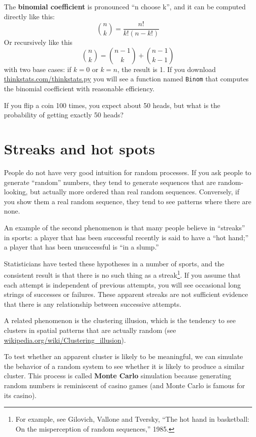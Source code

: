 \documentclass[12pt]{book}
\begin{document}
The {\bf binomial coefficient} is pronounced ``n choose k'', and it
can be computed directly like this:
%
\[ \binom{n}{k} = \frac{n!}{k!(n-k!)}  \]
%
Or recursively like this
%
\[ \binom{n}{k} = \binom{n-1}{k} + \binom{n-1}{k-1} \]
%
with two base cases: if $k=0$ or $k=n$, the result is 1.  If you
download \url{thinkstats.com/thinkstats.py} you will see a function
named {\tt Binom} that computes the binomial coefficient with reasonable
efficiency.

\begin{ex}
If you flip a coin 100 times, you expect about 50 heads, but what
is the probability of getting exactly 50 heads?


\end{ex}


\section{Streaks and hot spots}

People do not have very good intuition for random processes.  If you
ask people to generate ``random'' numbers, they tend to generate
sequences that are random-looking, but actually more ordered than real
random sequences.  Conversely, if you show them a real random
sequence, they tend to see patterns where there are none.

An example of the second phenomenon is that many people believe
in ``streaks'' in sports: a player that has been successful recently
is said to have a ``hot hand;'' a player that has been unsuccessful is
``in a slump.''

Statisticians have tested these hypotheses in a number of sports, and
the consistent result is that there is no such thing as a
streak\footnote{For example, see Gilovich, Vallone and Tversky, ``The
  hot hand in basketball: On the misperception of random sequences,''
  1985.}.  If you assume that each attempt is independent of previous
attempts, you will see occasional long strings of successes or
failures.  These apparent streaks are not sufficient evidence that
there is any relationship between successive attempts.

A related phenomenon is the clustering illusion, which is the
tendency to see clusters in spatial patterns that are actually
random (see \url{wikipedia.org/wiki/Clustering_illusion}).

To test whether an apparent
cluster is likely to be meaningful, we can simulate the behavior
of a random system to see whether it is likely to produce a similar
cluster.  This process is called {\bf Monte Carlo} simulation because
generating random numbers is reminiscent of casino games (and Monte
Carlo is famous for its casino).
\end{document}
